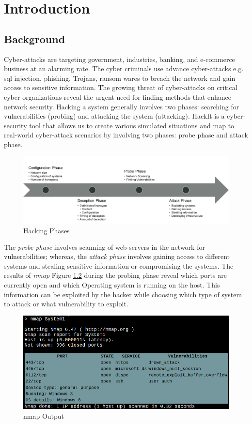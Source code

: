 \chapter{Introduction}
\label{chap1_introduction}
\section{Background}
Cyber-attacks are targeting government, industries, banking, and e-commerce business at an alarming rate. The cyber criminals use advance cyber-attacks e.g. sql injection, phishing, Trojans, ransom wares to breach the network and gain access to sensitive information. The growing threat of cyber-attacks on critical cyber organizations reveal the urgent need for finding methods that enhance network security. 
Hacking a system generally involves two phases:
searching for vulnerabilities (probing) and attacking the system (attacking). HackIt is a cyber-security tool that allows us to create various simulated situations and map to real-world cyber-attack scenarios by involving two phases: probe phase and attack phase.
\FloatBarrier
\begin{figure}[!htbp]
\centering
  \includegraphics[scale=1.3]{Chap1/hacking.png}
  \caption{Hacking Phases}\label{fig:figure1}
\end{figure}      
\FloatBarrier
The \textit{probe phase} involves scanning of web-servers in the network for vulnerabilities; whereas, the \textit{attack phase} involves gaining access to different systems and stealing sensitive information or compromising the systems. The results of \textit{nmap} Figure \ref{fig:figure2} during the probing phase reveal which ports are currently open and which Operating system is running on the host. This information can be exploited by the hacker while choosing which type of system to attack or what vulnerability to exploit.
\FloatBarrier
\begin{figure}[!htbp]
\centering
  \includegraphics[scale=0.5]{Chap1/nmap.png}
  \caption{nmap Output}\label{fig:figure2}
\end{figure}      
\FloatBarrier

